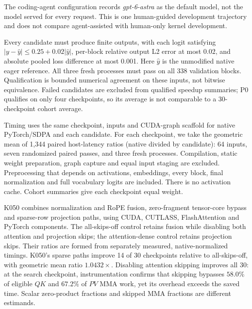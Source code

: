 The coding-agent configuration records \emph{gpt-6-astra} as the default
model, not the model served for every request. This is one human-guided
development trajectory and does not compare agent-assisted with human-only
kernel development.

Every candidate must produce finite outputs, with each logit satisfying
$|y-\hat y|\leq0.25+0.02|\hat y|$, per-block relative output L2 error at
most 0.02, and absolute pooled loss difference at most 0.001. Here
$\hat y$ is the unmodified native eager reference. All three fresh
processes must pass on all 338 validation blocks. Qualification is bounded
numerical agreement on these inputs, not bitwise equivalence. Failed
candidates are excluded from qualified speedup summaries; P0 qualifies on
only four checkpoints, so its average is not comparable to a 30-checkpoint
cohort average.

Timing uses the same checkpoint, inputs and CUDA-graph scaffold for native
PyTorch/SDPA and each candidate. For each checkpoint, we take the geometric
mean of 1,344 paired host-latency ratios (native divided by candidate): 64 inputs,
seven randomized paired passes, and three fresh processes. Compilation,
static weight preparation, graph capture and equal input staging
are excluded. Preprocessing that depends on activations, embeddings, every block,
final normalization and full vocabulary logits are included. There is no
activation cache. Cohort summaries give each checkpoint equal weight.

K050 combines normalization and RoPE fusion, zero-fragment tensor-core
bypass and sparse-row projection paths, using CUDA, CUTLASS,
FlashAttention and PyTorch components. The all-skips-off control retains
fusion while disabling both attention and projection skips; the
attention-dense control retains projection skips. Their ratios are formed
from separately measured, native-normalized timings. K050's sparse paths
improve 14 of 30 checkpoints relative to all-skips-off, with geometric
mean ratio $1.0432\times$. Disabling attention skipping improves all 30:
at the search checkpoint, instrumentation confirms that skipping bypasses
$58.0\%$ of eligible $QK$ and $67.2\%$ of $PV$ MMA work, yet its overhead
exceeds the saved time. Scalar zero-product fractions and skipped MMA
fractions are different estimands.

\begin{table}[htbp]
\centering\small
\caption{Numerically qualified full-model speedups against native SDPA
CUDA graphs. GM is the equal-checkpoint geometric mean; the range is across
qualified checkpoints, not a confidence interval. All conditions use one
RTX5090, BF16, batch one, 2,048 tokens and full vocabulary logits. P0's
four-checkpoint subset is shown only to document its limited qualification.}
\label{tab:kernel-ablations}

\end{table}

